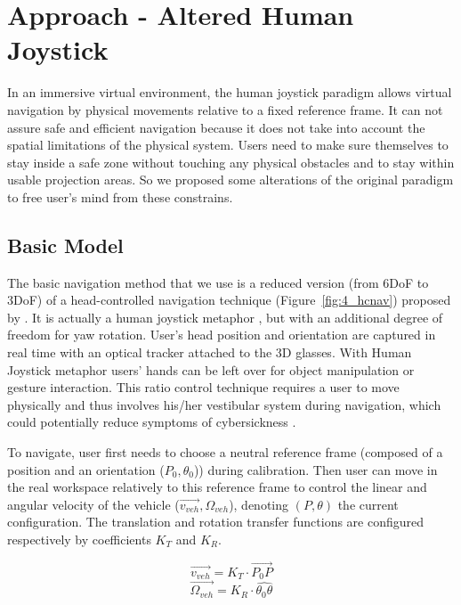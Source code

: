 \section{Approach - Altered Human Joystick}
\label{sec:ahj}
In an immersive virtual environment, the human joystick paradigm allows virtual navigation by physical movements relative to a fixed reference frame. It can not assure safe and efficient navigation because it does not take into account the spatial limitations of the physical system. Users need to make sure themselves to stay inside a safe zone without touching any physical obstacles and to stay within usable projection areas. So we proposed some alterations of the original paradigm to free user's mind from these constrains.

\subsection{Basic Model}
The basic navigation method that we use is a reduced version (from 6DoF to 3DoF) of a head-controlled navigation technique (Figure~\ref{fig:4_hcnav}) proposed by \citet{Bourdot2002HCNav}. It is actually a human joystick metaphor \citep{McMahan2012EDF}, but with an additional degree of freedom for yaw rotation. User's head position and orientation are captured in real time with an optical tracker attached to the 3D glasses. With Human Joystick metaphor users' hands can be left over for object manipulation or gesture interaction. This ratio control technique requires a user to move physically and thus involves his/her vestibular system during navigation, which could potentially reduce symptoms of cybersickness \citep{Chen2013NVW}.

To navigate, user first needs to choose a neutral reference frame (composed of a position and an orientation ($P_{0}, \theta_{0}$)) during calibration. Then user can move in the real workspace relatively to this reference frame to control the linear and angular velocity of the vehicle ($\overrightarrow{v_{veh}}, \Omega_{veh}$), denoting $(P, \theta)$ the current configuration. The translation and rotation transfer functions are configured respectively by coefficients $K_{T}$ and $K_{R}$.

\begin{equation}
\overrightarrow{v_{veh}}=K_{T}\cdot \overrightarrow{P_{0}P}
\end{equation}
\begin{equation}
\overrightarrow{\Omega_{veh}}=K_{R}\cdot \widehat{\theta_{0}\theta}
\end{equation}

